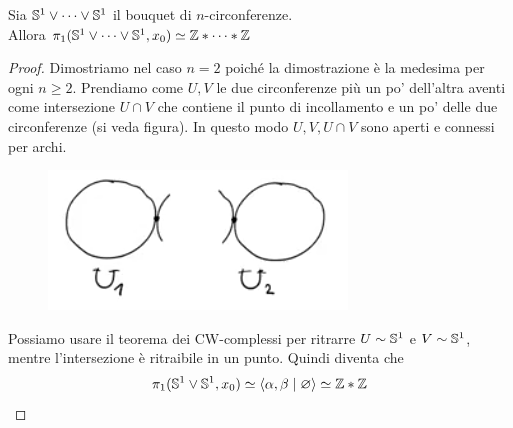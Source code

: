 \begin{xca}
	Sia $\S^1 \lor \dots \lor \S^1$ il bouquet di $n$-circonferenze. \\ Allora $\pi_1(\S^1 \lor \dots \lor \S^1, x_0) \simeq \Z \ast \dots \ast \Z$
\end{xca}
\begin{proof}
	Dimostriamo nel caso $n=2$ poiché la dimostrazione è la medesima per ogni $n \ge 2$. Prendiamo come $U, V$ le due circonferenze più un po' dell'altra aventi come intersezione $U \cap V$ che contiene il punto di incollamento e un po' delle due circonferenze (si veda figura). In questo modo $U,V,U \cap V$ sono aperti e connessi per archi.
	\begin{figure}[h]
		\centering
		\includegraphics[width=0.4\linewidth]{images/topologia_algebrica/bouquet-circle-fundamental-group}
		\caption{}
		\label{fig:bouquet-circle-fundamental-group}
	\end{figure}
	Possiamo usare il teorema dei CW-complessi per ritrarre $U \sim \S^1$ e $V \sim \S^1$, mentre l'intersezione è ritraibile in un punto. Quindi diventa che 
	\begin{equation*}
		\pi_1(\S^1 \lor \S^1, x_0) \simeq \left\langle \alpha, \beta \mid \varnothing \right\rangle \simeq \Z \ast \Z
	\end{equation*}
\end{proof}

